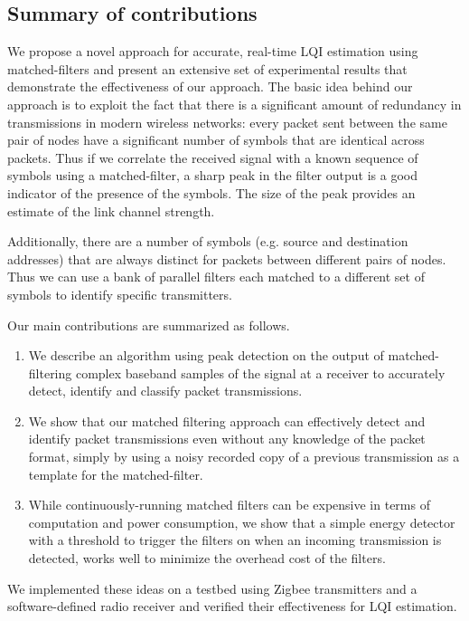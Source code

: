 \documentclass[journal]{IEEEtran}
\begin{document}
\subsection{Summary of contributions}

We propose a novel approach for accurate, real-time LQI estimation using
matched-filters and present an extensive set of experimental results that
demonstrate the effectiveness of our approach. The basic idea behind our
approach is to exploit the fact that there is a significant amount of
redundancy in transmissions in modern wireless networks: every packet sent
between the same pair of nodes have a significant number of symbols that are
identical across packets. Thus if we correlate the received signal with a known
sequence of symbols using a matched-filter, a sharp peak in the filter output
is a good indicator of the presence of the symbols. The size of the peak
provides an estimate of the link channel strength.

Additionally, there are a number of symbols (e.g. source and destination
addresses) that are always distinct for packets between different pairs of
nodes. Thus we can use a bank of parallel filters each matched to a different
set of symbols to identify specific transmitters.

Our main contributions are summarized as follows.
\begin{enumerate}

\item We describe an algorithm using peak detection on the output of
matched-filtering complex baseband samples of the signal at a receiver to
accurately detect, identify and classify packet transmissions.

\item We show that our matched filtering approach can effectively detect and
identify packet transmissions even without any knowledge of the packet format,
simply by using a noisy recorded copy of a previous transmission as a template
for the matched-filter.

\item While continuously-running matched filters can be expensive in terms of
computation and power consumption, we show that a simple energy detector with a
threshold to trigger the filters on when an incoming transmission is detected,
works well to minimize the overhead cost of the filters.

\end{enumerate}

We implemented these ideas on a testbed using Zigbee transmitters and a
software-defined radio receiver and verified their effectiveness for LQI
estimation.
\end{document}
